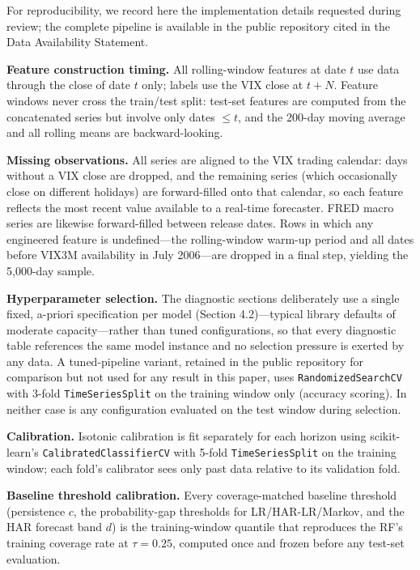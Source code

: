 \documentclass[12pt]{article}
\begin{document}
For reproducibility, we record here the implementation details requested during review; the
complete pipeline is available in the public repository cited in the Data Availability
Statement.

\textbf{Feature construction timing.} All rolling-window features at date $t$ use data through
the close of date $t$ only; labels use the VIX close at $t + N$. Feature windows never cross
the train/test split: test-set features are computed from the concatenated series but involve
only dates $\leq t$, and the 200-day moving average and all rolling means are backward-looking.

\textbf{Missing observations.} All series are aligned to the VIX trading calendar: days
without a VIX close are dropped, and the remaining series (which occasionally close on
different holidays) are forward-filled onto that calendar, so each feature reflects the most
recent value available to a real-time forecaster. FRED macro series are likewise
forward-filled between release dates. Rows in which any engineered feature is undefined---the
rolling-window warm-up period and all dates before VIX3M availability in July 2006---are
dropped in a final step, yielding the 5,000-day sample.

\textbf{Hyperparameter selection.} The diagnostic sections deliberately use a single fixed,
a-priori specification per model (Section 4.2)---typical library defaults of moderate
capacity---rather than tuned configurations, so that every diagnostic table references the
same model instance and no selection pressure is exerted by any data. A tuned-pipeline variant, retained in the public
repository for comparison but not used for any result in this paper, uses
\texttt{RandomizedSearchCV} with 3-fold \texttt{TimeSeriesSplit} on the training window only
(accuracy scoring). In neither case is any configuration evaluated on the
test window during selection.

\textbf{Calibration.} Isotonic calibration is fit separately for each horizon using
scikit-learn's \texttt{CalibratedClassifierCV} with 5-fold \texttt{TimeSeriesSplit} on the
training window;
each fold's calibrator sees only past data relative to its validation fold.

\textbf{Baseline threshold calibration.} Every coverage-matched baseline threshold
(persistence $c$, the probability-gap thresholds for LR/HAR-LR/Markov, and the HAR forecast
band $d$) is the training-window quantile that reproduces the RF's training coverage rate at
$\tau = 0.25$, computed once and frozen before any test-set evaluation.
\end{document}
